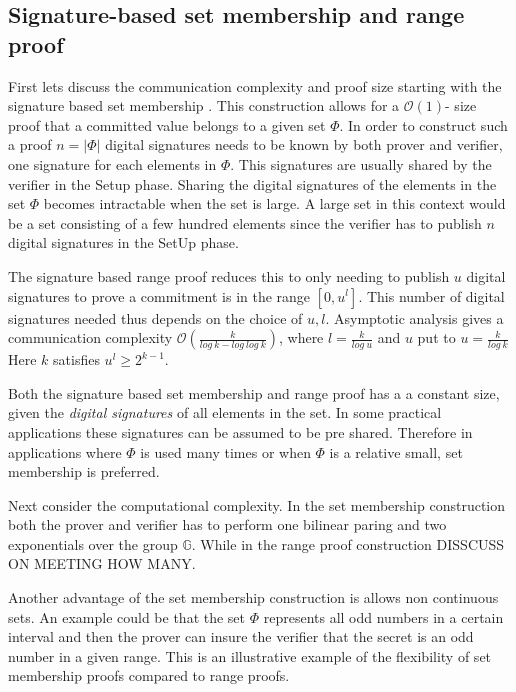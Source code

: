 \subsection{Signature-based set membership and range proof}

First lets discuss the communication complexity and proof size starting with the signature based set membership . This construction allows for a $\mathcal{O}(1)$- size proof that a committed value belongs to a given set $\Phi$. In order to construct such a proof $n=|\Phi|$ digital signatures needs to be known by both prover and verifier, one signature for each elements in $\Phi$. This signatures are usually shared by the verifier in the Setup phase. Sharing the digital signatures of the elements in the set $\Phi$ becomes intractable when the set is large.  A large set in this context would be a set consisting of a few hundred elements since the verifier has to publish $n$ digital signatures in the SetUp phase. 

The signature based range proof reduces this to only needing to publish $u$ digital signatures to prove a commitment is in the range $[0,u^l]$. 
This number of digital signatures needed thus depends on the choice of $u,l$. Asymptotic analysis gives a communication complexity $\mathcal{O}(\frac{k}{log\:k-log\:log\:k})$, where $l=\frac{k}{log\:u}$ and $u$ put to $u=\frac{k}{log\: k}$ Here $k$ satisfies $u^l \geq 2^{k-1}$.

Both the signature based set membership and range proof has a a constant size, given the \textit{digital signatures} of all elements in the set. In some practical applications these signatures can be assumed to be pre shared. Therefore in applications where $\Phi$ is used many times  or when $\Phi$ is a relative small, set membership is preferred.

Next consider the computational complexity.  In the set membership construction both the prover and verifier has to perform one bilinear paring and two  exponentials over the group $\mathds{G}$. While in the range proof construction DISSCUSS ON MEETING HOW MANY.
 
 
Another advantage of the set membership construction is allows non continuous sets. An example could be that the set $\Phi$ represents all odd numbers in a certain interval and then the prover can insure the verifier that the secret is an odd number in a given range. This is an illustrative example of the flexibility of set membership proofs compared to range proofs.




